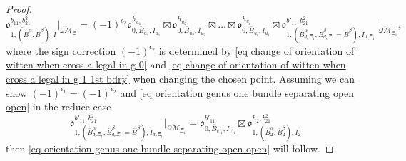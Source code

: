 \documentclass[11pt,a4paper]{article}
\theoremstyle{definition}
\theoremstyle{remark}
\newcommand{\oQMb}{{\overline{\mathcal{QM}}}}
\numberwithin{equation}{section}
\begin{document}
\begin{proof}
     $${\mathfrak{o}}^{b_{11},b_{21}^2}_{1,(\bar{B}^\alpha,\bar{B}^\beta),I}\big |_{\oQMb_\Xi}=(-1)^{\epsilon_2}{\mathfrak{o}}^{h_{u_1}}_{0,\bar B_{u_1},I_{u_1}}\boxtimes {\mathfrak{o}}^{h_{u_2}}_{0,\bar B_{u_2},I_{u_2}}\boxtimes \dots \boxtimes {\mathfrak{o}}^{h_{u_i}}_{0,\bar B_{u_i},I_{u_i}}\boxtimes {\mathfrak{o}}^{b'_{11},b_{21}^2}_{1,(\bar{B}^\alpha_{d_e\Xi_1},\bar{B}^\beta_{d_e\Xi_1}=\bar{B}^\beta),I_{d_e\Xi_1}}\big |_{\oQMb_{\Xi_1}},$$ 
     where the sign correction $(-1)^{\epsilon_2}$ is determined by \eqref{eq change of orientation of witten when cross a legal in g 0} and \eqref{eq change of orientation of witten when cross a legal in g 1 1st bdry} when changing the chosen point. Assuming we can show $(-1)^{\epsilon_1}=(-1)^{\epsilon_2}$ and \eqref{eq orientation genus one bundle separating open open} in the reduce case $${\mathfrak{o}}^{b'_{11},b_{21}^2}_{1,(\bar{B}^\alpha_{d_e\Xi_1},\bar{B}^\beta_{d_e\Xi_1}=\bar{B}^\beta),I_{d_e\Xi_1}}\big |_{\oQMb_{\Xi_1}}={\mathfrak{o}}^{b'_{11}}_{0,\bar B_{v'_1},I_{v'_1}}\boxtimes {\mathfrak{o}}^{h_2, b_{21}^2}_{1,(\bar{B}_2^\alpha,\bar{B}_2^\beta),I_2}$$
     then \eqref{eq orientation genus one bundle separating open open} will follow.


\end{proof}
\end{document}
